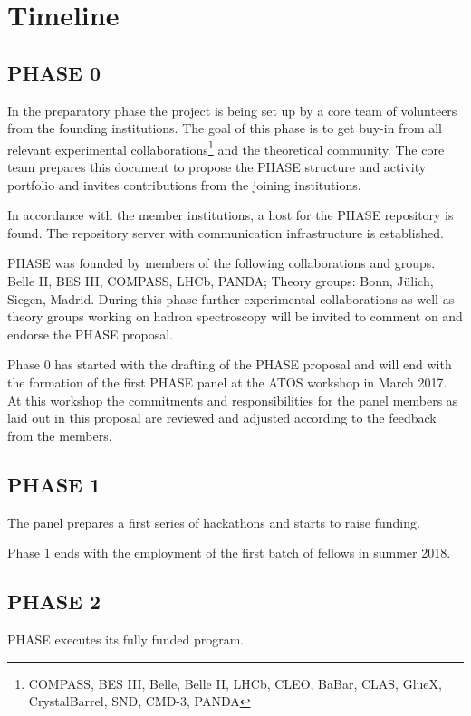 \section{Timeline}

\subsection{PHASE 0}
In the preparatory phase the project is being set up by a core team of volunteers from the founding institutions. The goal of this phase is to get buy-in from all relevant
experimental collaborations\footnote{COMPASS, BES III, Belle, Belle II, LHCb, CLEO, BaBar, CLAS, GlueX, CrystalBarrel, SND, CMD-3, PANDA} and the theoretical community.  The core team prepares this document to propose the PHASE structure and activity portfolio and invites contributions from the joining institutions.

In accordance with the member institutions, a host for the PHASE repository is found. The repository server with communication infrastructure is established.

PHASE was founded by members of the following collaborations and groups. Belle II, BES III, COMPASS, LHCb, PANDA; Theory groups: Bonn, J\"ulich, Siegen, Madrid.
During this phase further experimental collaborations as well as theory groups working on hadron spectroscopy will be invited to comment on and endorse the PHASE proposal. 

Phase 0 has started with the drafting of the PHASE proposal and will end with the formation of the first PHASE panel at the ATOS workshop in March 2017. At this workshop the commitments and responsibilities for the panel members as laid out in this proposal are reviewed and adjusted according to the feedback from the members.

\subsection{PHASE 1}
The panel prepares a first series of hackathons and starts to raise funding.

Phase 1 ends with the employment of the first batch of fellows in summer 2018.
\subsection{PHASE 2}
PHASE executes its fully funded program.